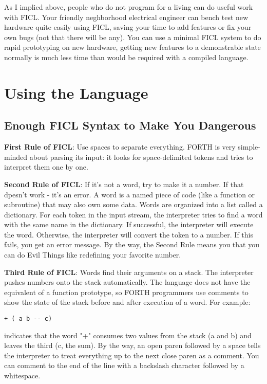 As I implied above, people who do not program for a living can
do useful work with FICL. Your friendly neghborhood electrical
engineer can bench test new hardware quite easily using FICL,
saving your time to add features or fix your own bugs (not that
there will be any). You can use a minimal FICL system to do
rapid prototyping on new hardware, getting new features to a
demonstrable state normally is much less time than would be
required with a compiled language.


\section{Using the Language}
\subsection{Enough FICL Syntax to Make You Dangerous}
\textbf{First Rule of FICL}: Use spaces to separate everything. FORTH is
very simple-minded about parsing its input: it looks for space-delimited
tokens and tries to interpret them one by one.

\textbf{Second Rule of FICL}: If it's not a word, try to make it a
number. If that dpesn't work - it's an error. A word is a named piece of
code (like a function or subroutine) that may also own some data. Words
are organized into a list called a dictionary. For each token in the
input stream, the interpreter tries to find a word with the same name
in the dictionary. If successful, the interpreter will execute the word.
Otherwise, the interpreter will convert the token to a number. If this
fails, you get an error message. By the way, the Second Rule means you
that you can do Evil Things like redefining your favorite number.

\textbf{Third Rule of FICL}: Words find their arguments on a stack. The
interpreter pushes numbers onto the stack automatically. The language
does not have the equivalent of a function prototype, so FORTH
programmers use comments to show the state of the stack before and
after execution of a word. For example:
\begin{lstlisting}[frame=single]
+ ( a b -- c)
\end{lstlisting}
indicates that the word "+" consumes two values from the stack (a and b)
and leaves the third (c, the sum). By the way, an open paren followed by
a space tells the interpreter to treat everything up to the next close
paren as a comment. You can comment to the end of the line with a
backslash character followed by a whitespace.


